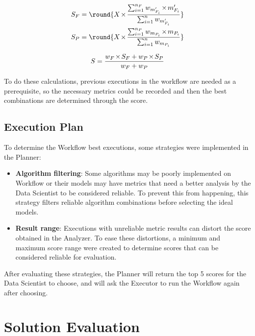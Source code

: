 \documentclass[runningheads]{llncs}
\DeclarePairedDelimiter{\round}\lfloor\rceil
\let\oldtimes\times
\def\times{{\mkern1mu\oldtimes\mkern1mu}}
\begin{document}
\begin{equation}
\label{eqn:groupScores}
	\begin{aligned}
	S_F = \round{X \times \frac{\sum_{i=1}^{n_F} w_{m'_{F_i}} \times m'_{F_i}}{\sum_{i=1}^{n} w_{m'_{F_i}}}}\\
	S_P = \round{X \times \frac{\sum_{i=1}^{n_P} w_{m_{P_i}} \times m_{P_i}}{\sum_{i=1}^{n} w_{m_{P_i}}}}
	\end{aligned}
\end{equation}

\begin{equation}
\label{eqn:totalScore}
	S = \frac{w_F \times S_F + w_P \times S_P}{w_F + w_P}
\end{equation}

To do these calculations, previous executions in the workflow are needed as a prerequisite, so the necessary metrics could be recorded and then the best combinations are determined through the score.

\subsection{Execution Plan}

To determine the Workflow best executions, some strategies were implemented in the Planner:

\begin{itemize}
\item \textbf{Algorithm filtering}: Some algorithms may be poorly implemented on Workflow or their models may have metrics that need a better analysis by the Data Scientist to be considered reliable. To prevent this from happening, this strategy filters reliable algorithm combinations before selecting the ideal models.
\item \textbf{Result range}: Executions with unreliable metric results can distort the score obtained in the Analyzer. To ease these distortions, a minimum and maximum score range were created to determine scores that can be considered reliable for evaluation.
\end{itemize}

After evaluating these strategies, the Planner will return the top 5 scores for the Data Scientist to choose, and will ask the Executor to run the Workflow again after choosing.

\section{Solution Evaluation}
\end{document}
